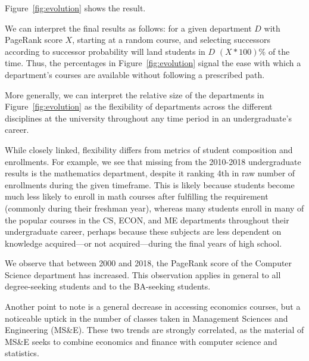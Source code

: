 Figure~\ref{fig:evolution} shows the result.

We can interpret the final results as follows: for a given department
$D$ with PageRank score $X$, starting at a random course, and
selecting successors according to successor probability will land
students in $D$ $(X * 100)$\% of the time. Thus, the percentages in
Figure~\ref{fig:evolution} signal the ease with which a department's
courses are available without following a prescribed path.

More generally, we can interpret the relative size of the departments
in Figure~\ref{fig:evolution} as the flexibility of departments across
the different disciplines at the university throughout any time period
in an undergraduate's career.

While closely linked, flexibility differs from metrics of student
composition and enrollments. For example, we see that missing from the
2010-2018 undergraduate results is the mathematics department, despite
it ranking 4th in raw number of enrollments during the given
timeframe. This is likely because students become much less likely to
enroll in math courses after fulfilling the requirement (commonly
during their freshman year), whereas many students enroll in many of
the popular courses in the CS, ECON, and ME departments throughout
their undergraduate career, perhaps because these subjects are less
dependent on knowledge acquired---or not acquired---during the final
years of high school.

We observe that between 2000 and 2018, the PageRank score of the
Computer Science department has increased. This observation applies in
general to all degree-seeking students and to the BA-seeking
students.

Another point to note is a general decrease in accessing economics
courses, but a noticeable uptick in the number of classes taken in
Management Sciences and Engineering (MS\&E). These two trends are
strongly correlated, as the material of MS\&E seeks to combine
economics and finance with computer science and statistics.

